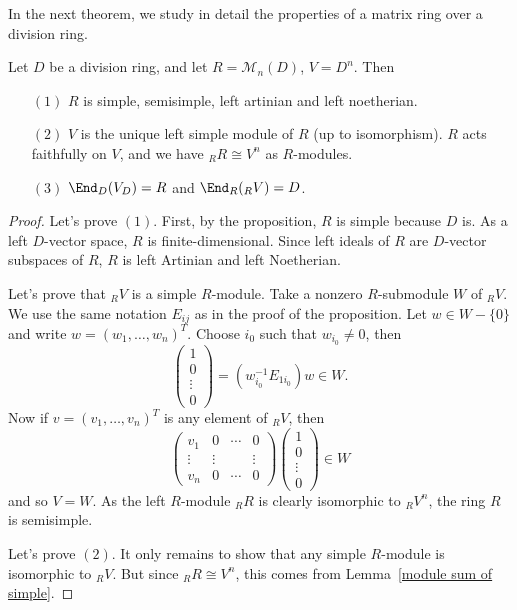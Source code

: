 In the next theorem, we study in detail the properties of a matrix ring
over a division ring.
\begin{theorem}\label{division matrix ring}
Let $D$ be a division ring, and let $R=\mathcal{M}_n(D)$, $V=D^n$. Then
\begin{itemize}
\item[$(1)$] $R$ is simple, semisimple, left artinian and left noetherian.
\item[$(2)$] $V$ is the unique left simple module of $R$ (up to isomorphism). $R$ acts faithfully on $V$, and we have $_{R}R\cong V^n$ as $R$-modules.
\item[$(3)$] $\End_D(V_D)=R$ and $\End_R(_{R}V)=D$.
\end{itemize}
\end{theorem}
\begin{proof}
Let's prove $(1)$. First, by the proposition, $R$ is simple because $D$ is. As a left $D$-vector space, $R$ is finite-dimensional. Since left ideals of $R$ are $D$-vector subspaces of $R$, $R$ is left Artinian and left Noetherian.\par
Let’s prove that $_{R}V$ is a simple $R$-module. Take a nonzero $R$-submodule $W$ of $_{R}V$. We use the same notation $E_{ij}$ as in the proof of the proposition. Let $w\in W-\{0\}$ and write $w=(w_1,\dots,w_n)^T$. Choose $i_0$ such that $w_{i_0}\neq 0$, then
\[\begin{pmatrix}
1\\
0\\
\vdots\\
0
\end{pmatrix}=(w_{i_0}^{-1}E_{1i_0})w\in W.\]
Now if $v=(v_1,\dots,v_n)^T$ is any element of $_{R}V$, then
\[\begin{pmatrix}
v_1&0&\cdots&0\\
\vdots&\vdots&&\vdots\\
v_n&0&\cdots&0
\end{pmatrix}\begin{pmatrix}
1\\
0\\
\vdots\\
0
\end{pmatrix}\in W\]
and so $V=W$. As the left $R$-module $_{R}R$ is clearly isomorphic to $_{R}V^n$, the ring $R$ is semisimple.\par
Let's prove $(2)$. It only remains to show that any simple $R$-module is isomorphic to $_{R}V$. But since $_{R}R\cong V^n$, this comes from Lemma~\ref{module sum of simple}.\par

\end{proof}
